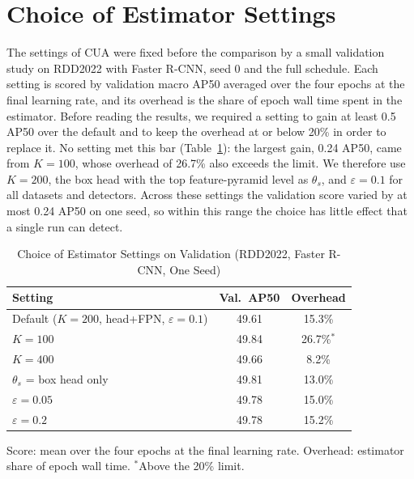 \documentclass[conference]{IEEEtran}
\begin{document}
\section{Choice of Estimator Settings}
\label{app:tuning}

The settings of CUA were fixed before the comparison by a small validation study on RDD2022 with Faster R-CNN, seed 0 and the full schedule. Each setting is scored by validation macro AP50 averaged over the four epochs at the final learning rate, and its overhead is the share of epoch wall time spent in the estimator. Before reading the results, we required a setting to gain at least 0.5 AP50 over the default and to keep the overhead at or below 20\% in order to replace it. No setting met this bar (Table~\ref{tab:tuning}): the largest gain, 0.24 AP50, came from $K=100$, whose overhead of 26.7\% also exceeds the limit. We therefore use $K=200$, the box head with the top feature-pyramid level as $\theta_s$, and $\varepsilon=0.1$ for all datasets and detectors. Across these settings the validation score varied by at most 0.24 AP50 on one seed, so within this range the choice has little effect that a single run can detect.

\begin{table}[t]
\caption{Choice of Estimator Settings on Validation (RDD2022, Faster R-CNN, One Seed)}
\label{tab:tuning}
\centering
\footnotesize
\setlength{\tabcolsep}{4pt}
\begin{tabular}{@{}lcc@{}}
\toprule
\textbf{Setting} & \textbf{Val.\ AP50} & \textbf{Overhead} \\
\midrule
Default ($K{=}200$, head+FPN, $\varepsilon{=}0.1$) & 49.61 & 15.3\% \\
$K=100$ & 49.84 & 26.7\%$^{\ast}$ \\
$K=400$ & 49.66 & 8.2\% \\
$\theta_s$ = box head only & 49.81 & 13.0\% \\
$\varepsilon=0.05$ & 49.78 & 15.0\% \\
$\varepsilon=0.2$ & 49.78 & 15.2\% \\
\bottomrule
\end{tabular}
\vspace{2pt}

\parbox{\columnwidth}{\footnotesize Score: mean over the four epochs at the final learning rate. Overhead: estimator share of epoch wall time. $^{\ast}$Above the 20\% limit.}
\end{table}



\end{document}
